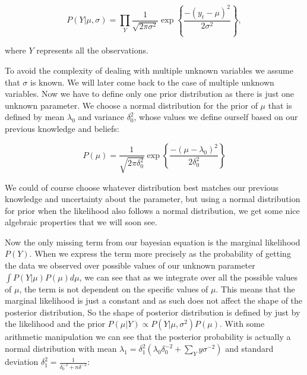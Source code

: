 \documentclass[12pt,a4paper,leqno]{report}
\theoremstyle{plain}
\theoremstyle{definition}
\theoremstyle{remark}
\begin{document}
\begin{def}\label{}
    \begin{equation}\label{}
        P(Y|\mu, \sigma)
        =
        \prod_{Y}
        \frac{1}
        {{\sqrt {2\pi \sigma^2} }}
        \exp{ \left \{ \frac{-(y_t-\mu)^2} {2\sigma^2} \right \} },
    \end{equation}
\end{def}where \(Y\) represents all the observations.

To avoid the complexity of dealing with multiple unknown variables we assume
that \(\sigma \) is known. We will later come back to the case of multiple
unknown variables. Now we have to define only one prior distribution as there is
just one unknown parameter. We choose a normal distribution for the prior of
\(\mu \) that is defined by mean \(\lambda_0 \) and variance \(\delta_0^2 \),
whose values we define ourself based on our previous knowledge and beliefs:

\begin{def}\label{}
    \begin{equation}\label{}
        P(\mu)
        =
        \frac{1}
        {{\sqrt {2\pi \delta_0^2} }}
        \exp{ \left \{\frac{-(\mu-\lambda_0)^2} {2\delta_0^2} \right \} }
    \end{equation}
\end{def}

We could of course choose whatever distribution best matches our previous
knowledge and uncertainty about the parameter, but using a normal distribution
for prior when the likelihood also follows a normal distribution, we get some
nice algebraic properties that we will soon see.

Now the only missing term from our bayesian equation is the marginal likelihood
\(P(Y) \). When we express the term more precisely as the probability of getting
the data we observed over possible values of our unknown parameter \(\int
P(Y|\mu)P(\mu) d\mu \), we can see that as we integrate over all the possible
values of \(\mu \), the term is not dependent on the specific values of \(\mu
\). This means that the marginal likelihood is just a constant and as such does
not affect the shape of the posterior distribution, So the shape of posterior
distribution is defined by just by the likelihood and the prior \(P(\mu|Y)
\propto P(Y|\mu, \sigma^2)P(\mu) \). With some arithmetic manipulation we can
see that the posterior probability is actually a normal distribution with mean
\(\lambda_1 = \delta_1^2 \left( \lambda_0 \delta_0^{-2} + \sum_{Y} y \sigma^{-2}
\right) \) and standard deviation \(\delta_1^2 =
\frac{1}{\delta_0^{-2}+n\delta^{-2}} \):
\end{document}

